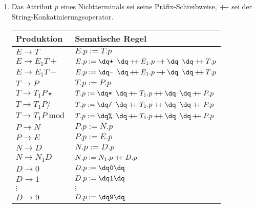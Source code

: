 \documentclass[a4paper,10pt]{scrartcl}
\begin{document}
\section{}
\begin{enumerate}
 \item  Das Attribut $p$ eines Nichtterminals sei seine Präfix-Schreibweise, $\mathbin{+\mkern-5mu+}$ sei der String-Konkatinierungsoperator.
        \begin{center}
            \begin{tabular}{l|l}
                \textbf{Produktion} & \textbf{Sematische Regel} \\\hline
                $E \to T$                       & $E.p := T.p$ \\
                $E \to E_1 T +$                 & $E.p := \str{+ } \concat E_1.p \concat \str{ } \concat T.p$ \\
                $E \to E_1 T -$                 & $E.p := \str{- } \concat E_1.p \concat \str{ } \concat T.p$ \\
                $T \to P$                       & $T.p := P.p$ \\
                $T \to T_1 P \star$             & $T.p := \str{* } \concat T_1.p \concat \str{ } \concat P.p$\\
                $T \to T_1 P /$                 & $T.p := \str{/ } \concat T_1.p \concat \str{ } \concat P.p$\\
                $T \to T_1 P \operatorname{mod}$& $T.p := \str{\% } \concat T_1.p \concat \str{ } \concat P.p$\\
                $P \to N$                       & $P.p := N.p$\\
                $P \to E$                       & $P.p := E.p$\\
                $N \to D$                       & $N.p := D.p$\\
                $N \to N_1D$                    & $N.p := N_1.p \mathbin{+\mkern-5mu+} D.p$\\
                $D \to 0$                       & $D.p := \str{0}$\\
                $D \to 1$                       & $D.p := \str{1}$\\
                $\vdots$                        & $\vdots$\\
                $D \to 9$                       & $D.p := \str{9}$\\
            \end{tabular}
        \end{center}

\end{enumerate}
\end{document}
